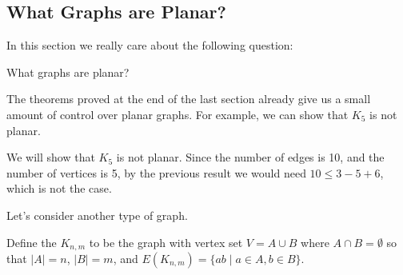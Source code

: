\documentclass[a4paper]{scrartcl}
\begin{document}
\subsection{What Graphs are Planar?}

In this section we really care about the following question:
\begin{center}
	What graphs are planar?
\end{center}

The theorems proved at the end of the last section already give us a small amount of control over planar graphs. For example, we can show that $K_5$ is not planar.

\begin{example}
	We will show that $K_5$ is not planar.
	Since the number of edges is 10, and the number of vertices is 5, by the previous result we would need $10 \leq 3 - 5 + 6$, which is not the case.
\end{example}

Let's consider another type of graph.

\begin{definition}
	Define the  $K_{n, m}$ to be the graph with vertex set $V = A \cup B$ where $A \cap B = \emptyset$ so that $|A| = n$, $|B| = m$, and $E(K_{n, m}) = \{ab \mid a \in A, b \in B\}$.
\end{definition}
\end{document}
